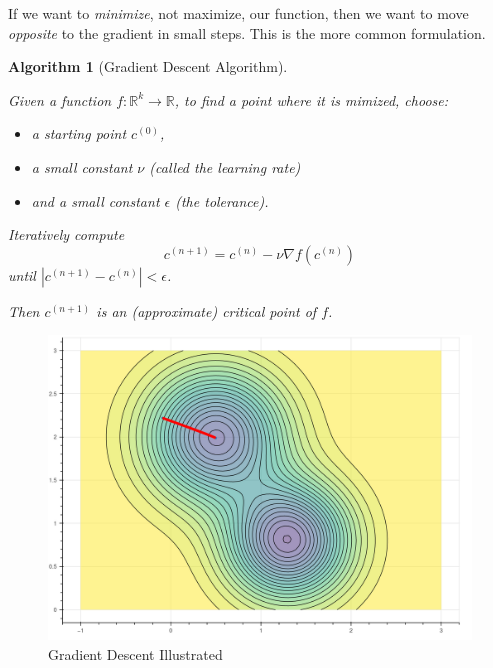 \documentclass[
  11pt,
  letterpaper,
]{scrbook}
\providecommand{\tightlist}{%
  \setlength{\itemsep}{0pt}\setlength{\parskip}{0pt}}\usepackage{longtable,booktabs,array}
\theoremstyle{plain}
\newtheorem{algorithm}{Algorithm}[chapter]
\theoremstyle{plain}
\theoremstyle{remark}
\begin{document}
If we want to \emph{minimize}, not maximize, our function, then we want
to move \emph{opposite} to the gradient in small steps. This is the more
common formulation.

\leavevmode{}%
\begin{algorithm}[Gradient Descent
Algorithm]\label{alg-gradient_descent}

Given a function \(f:\mathbb{R}^{k}\to \mathbb{R}\), to find a point
where it is mimized, choose:

\begin{itemize}
\tightlist
\item
  a starting point \(c^{(0)}\),
\item
  a small constant \(\nu\) (called the \emph{learning rate})
\item
  and a small constant \(\epsilon\) (the \emph{tolerance}).
\end{itemize}

Iteratively compute \[
c^{(n+1)}=c^{(n)} -\nu\nabla f(c^{(n)})
\] until \(|c^{(n+1)}-c^{(n)}|<\epsilon\).

Then \(c^{(n+1)}\) is an (approximate) critical point of \(f\).

\end{algorithm}

\begin{figure}

{\centering 

\includegraphics{chapters/img/gradient_descent.png}

}

\caption{\label{fig-graddescentillust}Gradient Descent Illustrated}

\end{figure}
\end{document}
